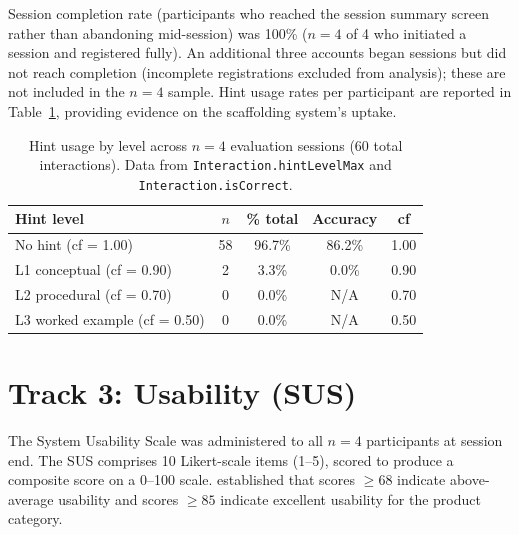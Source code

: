 Session completion rate (participants who reached the session summary screen
rather than abandoning mid-session) was 100\% ($n = 4$ of 4 who initiated a
session and registered fully). An additional three accounts began sessions but
did not reach completion (incomplete registrations excluded from analysis); these are not included in the $n = 4$
sample. Hint usage rates per participant are reported in
Table~\ref{tab:hint_usage}, providing evidence on the scaffolding system's
uptake.

\begin{table}[H]
\centering
\caption{Hint usage by level across $n = 4$ evaluation sessions (60 total
interactions). Data from \texttt{Interaction.hintLevelMax} and
\texttt{Interaction.isCorrect}.}
\label{tab:hint_usage}
\renewcommand{\arraystretch}{1.25}
\begin{tabularx}{\textwidth}{Xcccc}
\toprule
\textbf{Hint level} & \textbf{$n$} & \textbf{\% total}
  & \textbf{Accuracy} & \textbf{cf} \\
\midrule
No hint (cf = 1.00)           & 58 & 96.7\% & 86.2\% & 1.00 \\
L1 conceptual (cf = 0.90)     & 2  & 3.3\%  & 0.0\%  & 0.90 \\
L2 procedural (cf = 0.70)     & 0  & 0.0\%  & N/A    & 0.70 \\
L3 worked example (cf = 0.50) & 0  & 0.0\%  & N/A    & 0.50 \\
\bottomrule
\end{tabularx}
\end{table}

\section{Track 3: Usability (SUS)}
\label{sec:results_sus}

The System Usability Scale \parencite{brooke1996} was administered to all
$n = 4$ participants at session end. The SUS comprises 10 Likert-scale items
(1--5), scored to produce a composite score on a 0--100 scale.
\textcite{bangor2008} established that scores $\geq 68$ indicate above-average
usability and scores $\geq 85$ indicate excellent usability for the product
category.

